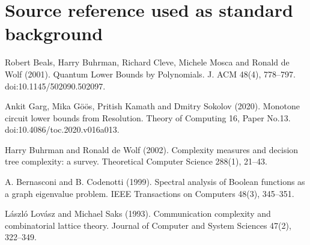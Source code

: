 \section*{Source reference used as standard background}
Robert Beals, Harry Buhrman, Richard Cleve, Michele Mosca and Ronald de Wolf (2001). Quantum Lower Bounds by Polynomials. J. ACM 48(4), 778--797. doi:10.1145/502090.502097.

Ankit Garg, Mika G\"o\"os, Pritish Kamath and Dmitry Sokolov (2020). Monotone circuit lower bounds from Resolution. Theory of Computing 16, Paper No.13. doi:10.4086/toc.2020.v016a013.

Harry Buhrman and Ronald de Wolf (2002). Complexity measures and decision tree complexity: a survey. Theoretical Computer Science 288(1), 21--43.

A. Bernasconi and B. Codenotti (1999). Spectral analysis of Boolean functions as a graph eigenvalue problem. IEEE Transactions on Computers 48(3), 345--351.

L\'aszl\'o Lov\'asz and Michael Saks (1993). Communication complexity and combinatorial lattice theory. Journal of Computer and System Sciences 47(2), 322--349.

